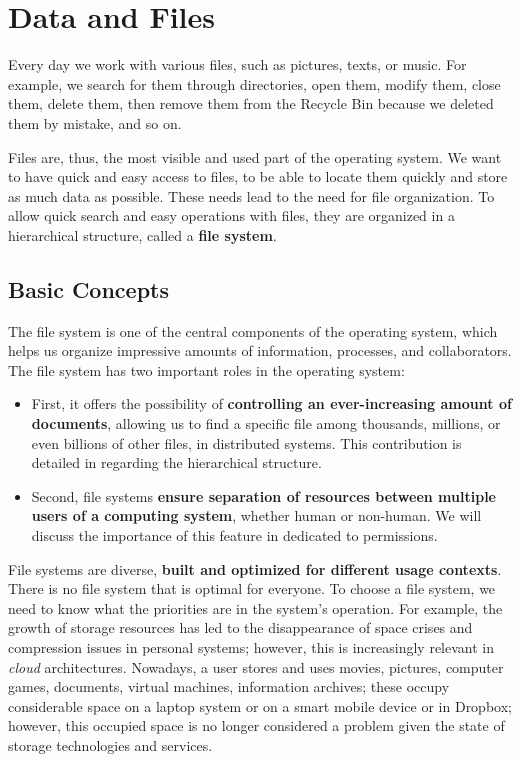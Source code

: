 \chapter{Data and Files}
\label{ch:fs}

Every day we work with various files, such as pictures, texts, or music.
For example, we search for them through directories, open them, modify them, close them, delete them, then remove them from the Recycle Bin because we deleted them by mistake, and so on.

Files are, thus, the most visible and used part of the operating system.
We want to have quick and easy access to files, to be able to locate them quickly and store as much data as possible.
These needs lead to the need for file organization.
To allow quick search and easy operations with files, they are organized in a hierarchical structure, called a \textbf{file system}.

\section{Basic Concepts}
\label{sec:data-files:concepts}

The file system is one of the central components of the operating system, which helps us organize impressive amounts of information, processes, and collaborators.
The file system has two important roles in the operating system:

\begin{itemize}
  \item First, it offers the possibility of \textbf{controlling an ever-increasing amount of documents}, allowing us to find a specific file among thousands, millions, or even billions of other files, in distributed systems.
    This contribution is detailed in  regarding the hierarchical structure.
  \item Second, file systems \textbf{ensure separation of resources between multiple users of a computing system}, whether human or non-human.
    We will discuss the importance of this feature in  dedicated to permissions.
\end{itemize}

File systems are diverse, \textbf{built and optimized for different usage contexts}.
There is no file system that is optimal for everyone.
To choose a file system, we need to know what the priorities are in the system's operation.
For example, the growth of storage resources has led to the disappearance of space crises and compression issues in personal systems;
however, this is increasingly relevant in \textit{cloud} architectures.
Nowadays, a user stores and uses movies, pictures, computer games, documents, virtual machines, information archives;
these occupy considerable space on a laptop system or on a smart mobile device or in Dropbox;
however, this occupied space is no longer considered a problem given the state of storage technologies and services.

